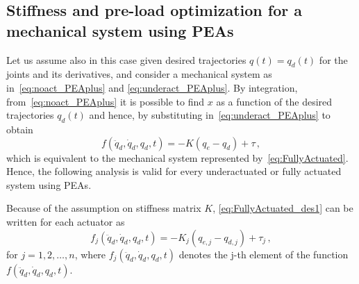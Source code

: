 \subsection{Stiffness and pre-load optimization for a mechanical system using PEAs}

Let us assume also in this case given desired trajectories $q(t)=q_d(t)$ for the joints and its derivatives, and consider a mechanical system as in~\eqref{eq:noact_PEAplus} and \eqref{eq:underact_PEAplus}. By integration, from~\eqref{eq:noact_PEAplus} it is possible to find $x$ as a function of the desired trajectories $q_d(t)$ and hence, by substituting in~\eqref{eq:underact_PEAplus} to obtain
\begin{equation}
\label{eq:FullyActuated_des1}
f(\ddot q_d,\dot q_d, q_d, t)=-K(q_e-q_d)+\tau\,,
\end{equation}
which is equivalent to the mechanical system represented by~\eqref{eq:FullyActuated}. Hence, the following analysis is valid for every underactuated or fully actuated system using PEAs. 

Because of the assumption on stiffness matrix $K$, \eqref{eq:FullyActuated_des1} can be written for each actuator as
\begin{equation}
\label{eq:FullyActuated_des2}
f_j(\ddot q_d,\dot q_d, q_d, t)=-K_j(q_{e,j}-q_{d,j})+\tau_j\,,
\end{equation}
for $j= 1, 2, \ldots, n$, where $f_j(\ddot{q}_d, \dot{q}_d, q_d, t)$ denotes the j-th element of the function $f(\ddot{q}_d, \dot{q}_d, q_d, t)$. 






